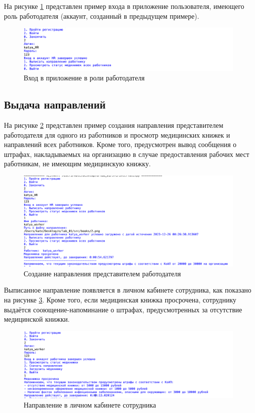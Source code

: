 \documentclass[12pt]{report}
\begin{document}
На рисунке \ref{fig:log-hr} представлен пример входа в приложение пользователя, имеющего роль работодателя (аккаунт, созданный в предыдущем примере).
\begin{figure}[h!]
	\centering
	\includegraphics[scale=0.8]{log-hr.png}
	\caption{Вход в приложение в роли работодателя}
	\label{fig:log-hr}
\end{figure}

\subsection{Выдача направлений}

На рисунке \ref{fig:dir-hr} представлен пример создания направления представителем работодателя для одного из работников и просмотр медицинских книжек и направлений всех работников. 
Кроме того, предусмотрен вывод сообщения о штрафах, накладываемых на организацию в случае предоставления рабочих мест работникам, не имеющим медицинскую книжку. 

\begin{figure}[h!]
	\centering
	\includegraphics[width = \linewidth]{hr-direction.png}
	\caption{Создание направления представителем работодателя}
	\label{fig:dir-hr}
\end{figure}

Выписанное направление появляется в личном кабинете сотрудника, как показано на рисунке \ref{dir-worker}. 
Кроме того, если медицинская книжка просрочена, сотруднику выдаётся сооющение-напоминание о штрафах, предусмотренных за отсутствие медицинской книжки.

\begin{figure}[h!]
	\centering
	\includegraphics[width = \linewidth]{worker-direction.png}
	\caption{Направление в личном кабинете сотрудника}
	\label{dir-worker}
\end{figure}
\end{document}
